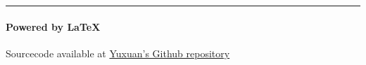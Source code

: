 




    

    \noindent\rule{\textwidth}{0.1pt}
    \vspace{-30pt}
    \paragraph*{Powered by \LaTeX}
    \hfill Sourcecode available at \href{<github.com/zhangyx1998/Courses_FALL2019>}{Yuxuan's Github repository}



